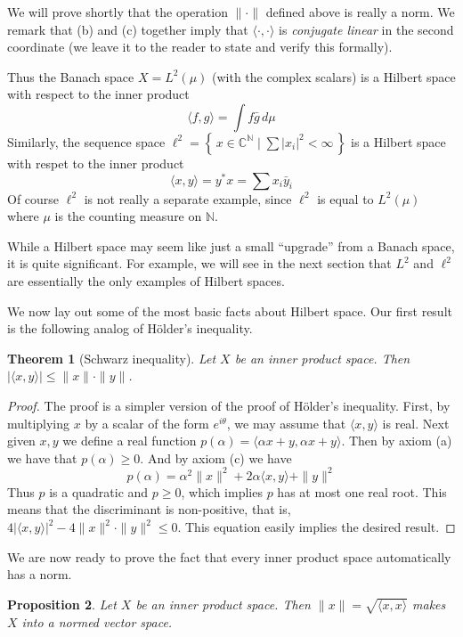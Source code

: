 \documentclass[11pt,oneside]{amsbook}
\newcommand{\set}[1]{\left\{\,#1\,\right\}}
\newcommand{\NN}{{\mathbb N}}
\newcommand{\CC}{{\mathbb C}}
\theoremstyle{definition}
\theoremstyle{plain}
\newtheorem{thm}{Theorem}[section]
\newtheorem{prop}[thm]{Proposition}
\theoremstyle{definition}
\theoremstyle{remark}
\numberwithin{equation}{section}
\numberwithin{figure}{section}
\begin{document}
We will prove shortly that the operation $\|\cdot\|$ defined above is really a norm. We remark that (b) and (c) together imply that $\langle\cdot,\cdot\rangle$ is \emph{conjugate linear} in the second coordinate (we leave it to the reader to state and verify this formally).

Thus the Banach space $X=L^2(\mu)$ (with the complex scalars) is a Hilbert space with respect to the inner product
\[\langle f,g\rangle=\int f\bar g\,d\mu
\]
Similarly, the sequence space $\ell^2=\set{x\in\CC^\NN\mid\sum |x_i|^2<\infty}$ is a Hilbert space with respet to the inner product
\[\langle x,y\rangle=y^*x=\sum x_i\bar{y}_i
\]
Of course $\ell^2$ is not really a separate example, since $\ell^2$ is equal to $L^2(\mu)$ where $\mu$ is the counting measure on $\NN$.

While a Hilbert space may seem like just a small ``upgrade'' from a Banach space, it is quite significant. For example, we will see in the next section that $L^2$ and $\ell^2$ are essentially the only examples of Hilbert spaces.

We now lay out some of the most basic facts about Hilbert space. Our first result is the following analog of H\"older's inequality.

\begin{thm}[Schwarz inequality]
  Let $X$ be an inner product space. Then $|\langle x,y\rangle|\leq\|x\|\cdot\|y\|$.
\end{thm}

\begin{proof}
  The proof is a simpler version of the proof of H\"older's inequality. First, by multiplying $x$ by a scalar of the form $e^{i\theta}$, we may assume that $\langle x,y\rangle$ is real. Next given $x,y$ we define a real function $p(\alpha)=\langle\alpha x+y,\alpha x+y\rangle$. Then by axiom (a) we have that $p(\alpha)\geq0$. And by axiom (c) we have
  \[p(\alpha)=\alpha^2\|x\|^2+2\alpha\langle x,y\rangle+\|y\|^2
  \]
  Thus $p$ is a quadratic and $p\geq0$, which implies $p$ has at most one real root. This means that the discriminant is non-positive, that is, $4|\langle x,y\rangle|^2-4\|x\|^2\cdot\|y\|^2\leq0$. This equation easily implies the desired result.
\end{proof}

We are now ready to prove the fact that every inner product space automatically has a norm.

\begin{prop}
  Let $X$ be an inner product space. Then $\|x\|=\sqrt{\langle x,x\rangle}$ makes $X$ into a normed vector space.
\end{prop}
\end{document}
